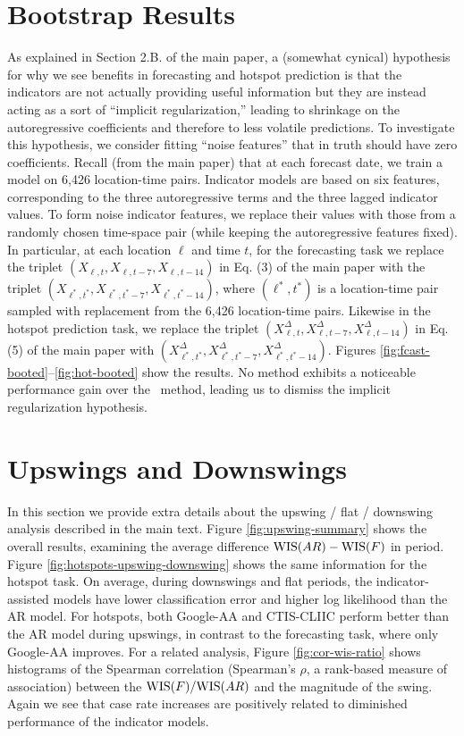 \section{Bootstrap Results}

As explained in Section 2.B. of the main paper, a (somewhat cynical) hypothesis
for why we see benefits in forecasting and hotspot prediction is that the
indicators are not actually providing useful information but they are instead
acting as a sort of ``implicit regularization,'' leading to shrinkage on the
autoregressive coefficients and therefore to less volatile predictions.  To
investigate this hypothesis, we consider fitting ``noise features'' that in
truth should have zero coefficients.  Recall (from the main paper) that at each
forecast date, we train a model on 6,426 location-time pairs.  Indicator models
are based on six features, corresponding to the three autoregressive terms and
the three lagged indicator values.  To form noise indicator features, we replace
their values with those from a randomly chosen time-space pair (while keeping
the autoregressive features fixed).  In particular, at each location $\ell$ and
time $t$, for the forecasting task we replace the triplet $(X_{\ell,t},
X_{\ell,t-7}, X_{\ell,t-14})$ in Eq. (3) of the main paper with the triplet
$(X_{\ell^*,t^*}, X_{\ell^*,t^*-7}, X_{\ell^*,t^*-14})$, where $(\ell^*,t^*)$ is
a location-time pair sampled with replacement from the 6,426 location-time
pairs.  Likewise in the hotspot prediction task, we replace the triplet
$(X_{\ell,t}^\Delta, X_{\ell,t-7}^\Delta, X_{\ell,t-14}^\Delta)$ in Eq. (5) of
the main paper with $(X_{\ell^*,t^*}^\Delta, X_{\ell^*,t^*-7}^\Delta,
X_{\ell^*,t^*-14}^\Delta)$.  Figures
\ref{fig:fcast-booted}--\ref{fig:hot-booted} show the results.  No method
exhibits a noticeable performance gain over the \ar~method, leading us to
dismiss the implicit regularization hypothesis.

\section{Upswings and Downswings}

In this section we provide extra details about the upswing / flat / downswing
analysis described in the main text. Figure \ref{fig:upswing-summary} shows the
overall results, examining the average difference $\mathrm{WIS}(AR) - \mathrm{WIS}(F)$ in
period. Figure \ref{fig:hotspots-upswing-downswing} shows the same information
for the hotspot task. On average, during downswings and flat periods, the
indicator-assisted models have lower classification error and higher log
likelihood than the AR model. For hotspots, both Google-AA and CTIS-CLIIC
perform better than the AR model during upswings, in contrast to the forecasting
task, where only Google-AA improves. For a related analysis, Figure
\ref{fig:cor-wis-ratio} shows histograms of the Spearman correlation (Spearman's
$\rho$, a rank-based measure of association) between the $\mathrm{WIS}(F)/\mathrm{WIS}(AR)$ and
the magnitude of the swing. Again we see that case rate increases are positively
related to diminished performance of the indicator models.

